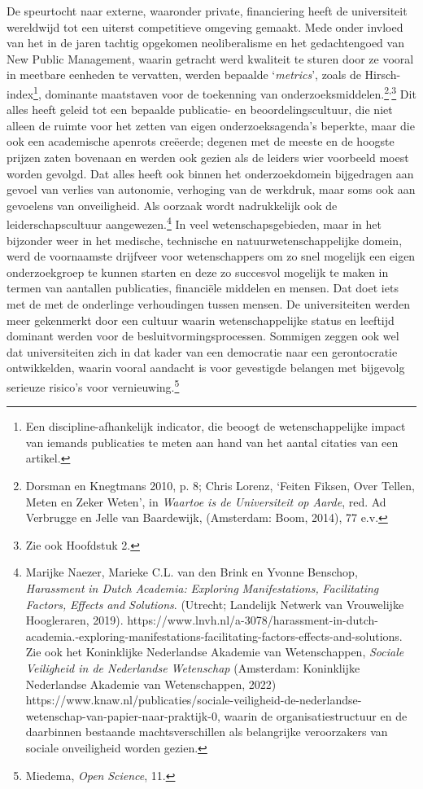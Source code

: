 \documentclass[smallauthor, chapterhaspagenum, nochapterinheader, pagenuminheader,  bigchapnum,medium2, tocpages,  garamond, titleinheader]{jote-book}
\begin{document}
	De speurtocht naar externe, waaronder private, financiering heeft de universiteit wereldwijd tot een uiterst competitieve omgeving gemaakt. Mede onder invloed van het in de jaren tachtig opgekomen neoliberalisme en het gedachtengoed van New Public Management, waarin getracht werd kwaliteit te sturen door ze vooral in meetbare eenheden te vervatten, werden bepaalde ‘\emph{metrics}', zoals de Hirsch-index\footnote{Een discipline-afhankelijk indicator, die beoogt de wetenschappelijke impact van iemands publicaties te meten aan hand van het aantal citaties van een artikel. }, dominante maatstaven voor de toekenning van onderzoeksmiddelen.\footnote{Dorsman en Knegtmans 2010, p. 8; Chris Lorenz, ‘Feiten Fiksen, Over Tellen, Meten en Zeker Weten', in \emph{Waartoe is de Universiteit op Aarde}, red. Ad Verbrugge en Jelle van Baardewijk, (Amsterdam: Boom, 2014), 77 e.v.}\textsuperscript{,}\footnote{Zie ook Hoofdstuk 2.} Dit alles heeft geleid tot een bepaalde publicatie- en beoordelingscultuur, die niet alleen de ruimte voor het zetten van eigen onderzoeksagenda's beperkte, maar die ook een academische apenrots creëerde; degenen met de meeste en de hoogste prijzen zaten bovenaan en werden ook gezien als de leiders wier voorbeeld moest worden gevolgd. Dat alles heeft ook binnen het onderzoekdomein bijgedragen aan gevoel van verlies van autonomie, verhoging van de werkdruk, maar soms ook aan gevoelens van onveiligheid. Als oorzaak wordt nadrukkelijk ook de leiderschapscultuur aangewezen.\footnote{Marijke Naezer, Marieke C.L. van den Brink en Yvonne Benschop, \emph{Harassment}\emph{ in Dutch }\emph{Academia}\emph{: }\emph{Exploring}\emph{ }\emph{Manifestations}\emph{, }\emph{Facilitating}\emph{ Factors, }\emph{Effects}\emph{ }\emph{and}\emph{ Solutions}. (Utrecht; Landelijk Netwerk van Vrouwelijke Hoogleraren, 2019). https://www.lnvh.nl/a-3078/harassment-in-dutch-academia.-exploring-manifestations-facilitating-factors-effects-and-solutions. Zie ook het Koninklijke Nederlandse Akademie van Wetenschappen, \emph{Sociale Veiligheid in de Nederlandse Wetenschap}\emph{ }(Amsterdam: Koninklijke Nederlandse Akademie van Wetenschappen, 2022) https://www.knaw.nl/publicaties/sociale-veiligheid-de-nederlandse-wetenschap-van-papier-naar-praktijk-0, waarin de organisatiestructuur en de daarbinnen bestaande machtsverschillen als belangrijke veroorzakers van sociale onveiligheid worden gezien.} In veel wetenschapsgebieden, maar in het bijzonder weer in het medische, technische en natuurwetenschappelijke domein, werd de voornaamste drijfveer voor wetenschappers om zo snel mogelijk een eigen onderzoekgroep te kunnen starten en deze zo succesvol mogelijk te maken in termen van aantallen publicaties, financiële middelen en mensen. Dat doet iets met de met de onderlinge verhoudingen tussen mensen. De universiteiten werden meer gekenmerkt door een cultuur waarin wetenschappelijke status en leeftijd dominant werden voor de besluitvormingsprocessen. Sommigen zeggen ook wel dat universiteiten zich in dat kader van een democratie naar een gerontocratie ontwikkelden, waarin vooral aandacht is voor gevestigde belangen met bijgevolg serieuze risico's voor vernieuwing.\footnote{Miedema, \emph{Open }\emph{Science}, 11.}
\end{document}
